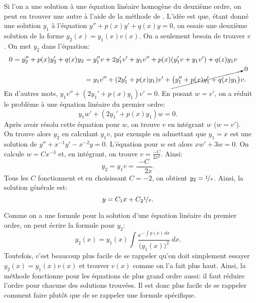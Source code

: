\medskip

Si l'on a une solution à une équation linéaire homogène du deuxième ordre, on peut en trouver une autre à l'aide de la méthode de  \emph{}.  
L'idée est que, étant donné une solution $y_1$ à l'équation
$y'' + p(x) y' + q(x) y = 0$, on essaie une deuxième solution de la forme $y_2(x) = y_1(x) v(x)$.
On a seulement besoin de trouver $v$.  On met $y_2$ dans l'équation:
\begin{align*}
	0 =  y_2'' + p(x) y_2' + q(x) y_2 
	& =  y_1'' v + 2 y_1' v' + y_1 v''
			+ p(x) ( y_1' v + y_1 v' )
			+ q(z) y_1 v \\
	& = y_1 v'' + (2 y_1' + p(x) y_1) v'
		+ \cancelto{0}{\bigl( y_1'' + p(x) y_1' + q(x) y_1 \bigr)} v .
\end{align*}
En d'autres mots,  $y_1 v'' + (2 y_1' + p(x) y_1) v' = 0$.  
En posant $w = v'$, on a réduit le problème à une équation linéaire du premier ordre:
\begin{equation*}
	y_1 w' + (2 y_1' + p(x) y_1) w = 0.
\end{equation*}
%
Après avoir résolu cette équation pour $w$,
on trouve $v$ en intégrant $w$ ($w=v'$).  On trouve alors $y_2$ en calculant
$y_1 v$, par exemple en admettant que $y_1 = x$ est une solution
de $y''+x^{-1}y'-x^{-2} y=0$.
L'équation pour $w$ est alors
$xw' + 3 w = 0$.  On calcule $w = Cx^{-3}$ et, en intégrant, on trouve  $v = \frac{-C}{2x^2}$.
Ainsi:
\begin{equation*}
	y_2 = y_1 v = \frac{-C}{\phantom-2x}.
\end{equation*}
%
Tous les $C$ fonctionnent et en choisissant $C=-2$, 
on obtient $y_2 = \nicefrac{1}{x}$.  Ainsi, la solution générale est:
\begin{equation*}
	y = C_1 x + C_2\nicefrac{1}{x}.
\end{equation*}

Comme on a une formule pour la solution d'une équation linéaire du premier ordre, 
on peut écrire la formule pour $y_2$:
\begin{equation*}
	y_2(x) = y_1(x) \int \frac{e^{-\int p(x)\,dx}}{{\bigl(y_1(x)\bigr)}^2} \,dx.
\end{equation*}
Toutefois, c'est beaucoup plus facile de se rappeler qu'on doit simplement essayer $y_2(x) =
y_1(x) v(x)$ et trouver $v(x)$ comme on l'a fait plus haut.  
Ainsi, la méthode fonctionne pour les équations de plus grand ordre aussi: 
il faut réduire l'ordre pour chacune des solutions trouvées. 
Il est donc plus facile de se rappeler comment faire plutôt que de se rappeler une formule spécifique. 



